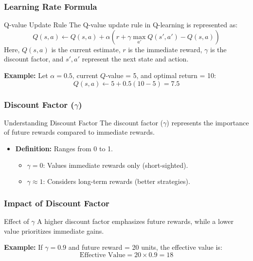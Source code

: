 \documentclass{beamer}
\begin{document}
\begin{frame}[fragile]
    \frametitle{Learning Rate Formula}
    \begin{block}{Q-value Update Rule}
        The Q-value update rule in Q-learning is represented as:
        \begin{equation}
            Q(s, a) \leftarrow Q(s, a) + \alpha \left( r + \gamma \max_{a'} Q(s', a') - Q(s, a) \right)
        \end{equation}
        Here, $Q(s, a)$ is the current estimate, $r$ is the immediate reward, $\gamma$ is the discount factor, and $s', a'$ represent the next state and action.
    \end{block}
    \begin{example}
        \textbf{Example:} Let $\alpha = 0.5$, current $Q$-value = 5, and optimal return = 10:
        \begin{equation}
            Q(s, a) \leftarrow 5 + 0.5 \left( 10 - 5 \right) = 7.5
        \end{equation}
    \end{example}
\end{frame}

\begin{frame}[fragile]
    \frametitle{Discount Factor ($\gamma$)}
    \begin{block}{Understanding Discount Factor}
        The discount factor ($\gamma$) represents the importance of future rewards compared to immediate rewards.
    \end{block}
    \begin{itemize}
        \item \textbf{Definition:} Ranges from 0 to 1.
        \begin{itemize}
            \item \textbf{$\gamma = 0$}: Values immediate rewards only (short-sighted).
            \item \textbf{$\gamma \approx 1$}: Considers long-term rewards (better strategies).
        \end{itemize}
    \end{itemize}
\end{frame}

\begin{frame}[fragile]
    \frametitle{Impact of Discount Factor}
    \begin{block}{Effect of $\gamma$}
        A higher discount factor emphasizes future rewards, while a lower value prioritizes immediate gains.
    \end{block}
    \begin{example}
        \textbf{Example:} If $\gamma = 0.9$ and future reward = 20 units, the effective value is:
        \begin{equation}
            \text{Effective Value} = 20 \times 0.9 = 18
        \end{equation}
    \end{example}
\end{frame}
\end{document}
